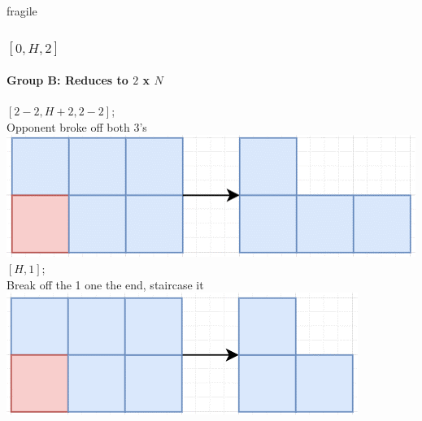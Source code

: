 \documentclass[aspectratio=169,usenames,dvipsnames]{beamer}
\begin{document}
\begin{frame}{fragile}
    \frametitle{$[0, H, 2]$}
    \framesubtitle{Group B: Reduces to $2$ x $N$}
    
    \begin{multicols}{2}
    $[2 - 2, H + 2, 2 - 2]$; \\
    Opponent broke off both 3's\\
    \includegraphics[scale=.4]{images/[0, H, 2].png}\\
    $[H, 1]$; \\
    Break off the 1 one the end, staircase it\\
    \includegraphics[scale=.4]{images/[H, 1].png}
    \end{multicols}
\end{frame}
\end{document}
